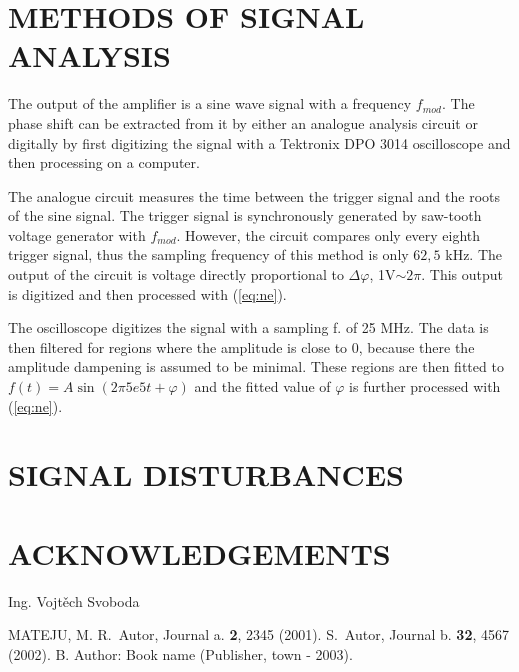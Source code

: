 \documentclass[twoside]{articlek}
\begin{document}
\section{METHODS OF SIGNAL ANALYSIS}

The output of the amplifier is a sine wave signal with a frequency $f_{mod}$. The phase shift can be extracted from it by either an analogue analysis circuit or digitally by first digitizing the signal with a Tektronix DPO 3014 oscilloscope and then processing on a computer. 

The analogue circuit measures the time between the trigger signal and the roots of the sine signal. The trigger signal is synchronously generated by saw-tooth voltage generator with $f_{mod}$. However, the circuit compares only every eighth trigger signal, thus the sampling frequency of this method is only $62,5$ kHz. The output of the circuit is voltage directly proportional to $\Delta \varphi $, 1V$\sim 2\pi$. This output is digitized and then processed with (\ref{eq:ne}).

The oscilloscope digitizes the signal with a sampling f. of 25 MHz. The data is then filtered for regions where the amplitude is close to 0, because there the amplitude dampening is assumed to be minimal. These regions are then fitted to $f(t)=A\sin(2 \pi 5e5 t+ \varphi)$ and the fitted value of $\varphi$ is further processed with (\ref{eq:ne}).

\section{SIGNAL DISTURBANCES}


\section{ACKNOWLEDGEMENTS}

Ing. Vojtěch Svoboda %


\begin{thebibliography}{99}

\leftskip=-5pt \vspace{-0.3truecm}
 MATEJU, M.
 R.~Autor, Journal a. {\bf 2}, 2345 (2001).
 S.~Autor, Journal b. {\bf 32}, 4567 (2002).
 B. Author: Book name (Publisher, town - 2003).
\end{thebibliography}
\end{document}

